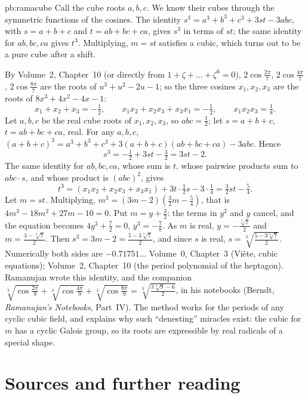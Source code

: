\begin{solution}{pb:ramacube}
\idea Call the cube roots $a,b,c$. We know their cubes through the symmetric functions of the cosines. The identity
$s^3=a^3+b^3+c^3+3st-3abc$, with $s=a+b+c$ and $t=ab+bc+ca$, gives $s^3$ in terms of $st$; the same identity for $ab,bc,ca$
gives $t^3$. Multiplying, $m=st$ satisfies a cubic, which turns out to be a pure cube after a shift.

\writeup By Volume~2, Chapter~10 (or directly from $1+\zeta+\dots+\zeta^6=0$), $2\cos\frac{2\pi}7$, $2\cos\frac{4\pi}7$,
$2\cos\frac{8\pi}7$ are the roots of $u^3+u^2-2u-1$; so the three cosines $x_1,x_2,x_3$ are the roots of $8x^3+4x^2-4x-1$:
\[
x_1+x_2+x_3=-\tfrac12,\qquad x_1x_2+x_2x_3+x_3x_1=-\tfrac12,\qquad x_1x_2x_3=\tfrac18.
\]
Let $a,b,c$ be the real cube roots of $x_1,x_2,x_3$, so $abc=\frac12$; let $s=a+b+c$, $t=ab+bc+ca$, real. For any $a,b,c$,
$(a+b+c)^3=a^3+b^3+c^3+3(a+b+c)(ab+bc+ca)-3abc$. Hence
\[
s^3=-\tfrac12+3st-\tfrac32=3st-2.
\]
The same identity for $ab,bc,ca$, whose sum is $t$, whose pairwise products sum to $abc\cdot s$, and whose product is
$(abc)^2$, gives
\[
t^3=(x_1x_2+x_2x_3+x_3x_1)+3t\cdot\tfrac12s-3\cdot\tfrac14=\tfrac32st-\tfrac54.
\]
Let $m=st$. Multiplying, $m^3=(3m-2)(\frac32m-\frac54)$, that is $4m^3-18m^2+27m-10=0$. Put $m=y+\frac32$: the terms in $y^2$
and $y$ cancel, and the equation becomes $4y^3+\frac72=0$, $y^3=-\frac78$. As $m$ is real, $y=-\frac{\sqrt[3]7}2$ and
$m=\frac{3-\sqrt[3]7}2$. Then $s^3=3m-2=\frac{5-3\sqrt[3]7}2$, and since $s$ is real, $s=\sqrt[3]{\frac{5-3\sqrt[3]7}2}$.
Numerically both sides are $-0.71751\ldots$
\tools Volume~0, Chapter~3 (Viète, cubic equations); Volume~2, Chapter~10 (the period polynomial of the heptagon).
\leads Ramanujan wrote this identity, and the companion
$\sqrt[3]{\cos\frac{2\pi}9}+\sqrt[3]{\cos\frac{4\pi}9}+\sqrt[3]{\cos\frac{8\pi}9}=\sqrt[3]{\frac{3\sqrt[3]9-6}2}$, in his notebooks
(Berndt, \emph{Ramanujan's Notebooks}, Part~IV). The method works for the periods of any cyclic cubic field, and explains
why such ``denesting'' miracles exist: the cubic for $m$ has a cyclic Galois group, so its roots are expressible by real
radicals of a special shape.
\end{solution}

\section*{Sources and further reading}

